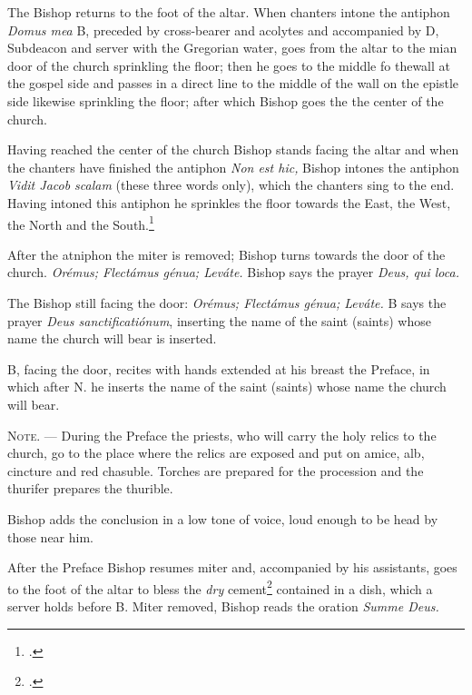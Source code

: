 \documentclass[letterpaper]{report}
\begin{document}
{\rubric The Bishop returns to the foot of the altar. When chanters intone the antiphon
\textit{Domus mea} B, preceded by cross-bearer and acolytes and accompanied by D, Subdeacon and
server with the Gregorian water, goes from the altar to the mian door of the
church sprinkling the floor; then he goes to the middle fo thewall at the
gospel side and passes in a direct line to the middle of the wall on the
epistle side likewise sprinkling the floor; after which Bishop goes the the center
of the church.

\rubric Having reached the center of the church Bishop stands facing the altar and
when the chanters have finished the antiphon \textit{Non est hic,} Bishop intones
the antiphon \textit{Vidit Jacob scalam} (these three words only), which the
chanters sing to the end. Having intoned this antiphon he sprinkles the floor
towards the East, the West, the North and the South.\footcite[The Rubric in the
\textit{Pontificale Romanum} supposes the altar to be towards the East; the
bishop, therefore, sprinkles the floor before him, behind him, at his left and
than at his right.][footnote 1, p. 74.]{consecranda}

\rubric After the atniphon the miter is removed; Bishop turns towards the door of
the church. \textit{Orémus; Flectámus génua; Leváte.} Bishop says the prayer
\textit{Deus, qui loca.}

\rubric The Bishop still facing the door: \textit{Orémus; Flectámus génua; Leváte.} B
says the prayer \textit{Deus sanctificatiónum}, inserting the name of the saint
(saints) whose name the church will bear is inserted.

\rubric B, facing the door, recites with hands extended at his breast the
Preface, in which after N. he inserts the name of the saint (saints) whose name
the church will bear.

\textsc{Note. ---} During the Preface the priests, who will carry the holy
relics to the church, go to the place where the relics are exposed and put on
amice, alb, cincture and red chasuble. Torches are prepared for the procession
and the thurifer prepares the thurible.

Bishop adds the conclusion in a low tone of voice, loud enough to be head by those
near him.

\rubric After the Preface Bishop resumes miter and, accompanied by his assistants,
goes to the foot of the altar to bless the \textit{dry} cement\footcite[The
Pontifical prescrives that he should first mix the cement with the water which
he previously blessed and then bless the mixture. This is not feasible and
consequently it is better to keep sufficient amount of water in a separate
vessel to be poured over the dry cement shortly before it is to be used for
closing the sepulcher.][footnote, p. 77.]{consecranda} contained in a dish,
which a server holds before B. Miter removed, Bishop reads the oration \textit{Summe
Deus.}

}
\end{document}
